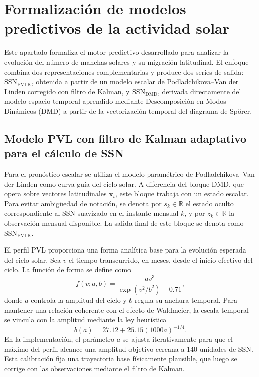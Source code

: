 \section{Formalización de modelos predictivos de la actividad solar}
\label{sec:forecast}

Este apartado formaliza el motor predictivo desarrollado para analizar la evolución del número de manchas solares y su migración latitudinal. El enfoque combina dos representaciones complementarias y produce dos series de salida: $\mathrm{SSN}_{\mathrm{PVLK}}$, obtenida a partir de un modelo escalar de Podladchikova--Van der Linden corregido con filtro de Kalman, y $\mathrm{SSN}_{\mathrm{DMD}}$, derivada directamente del modelo espacio-temporal aprendido mediante Descomposición en Modos Dinámicos (DMD) a partir de la vectorización temporal del diagrama de Spörer.

\subsection{Modelo PVL con filtro de Kalman adaptativo para el cálculo de SSN}

Para el pronóstico escalar se utiliza el modelo paramétrico de Podladchikova--Van der Linden como curva guía del ciclo solar. A diferencia del bloque DMD, que opera sobre vectores latitudinales $\mathbf{x}_t$, este bloque trabaja con un estado escalar. Para evitar ambigüedad de notación, se denota por $s_k\in\mathbb{R}$ el estado oculto correspondiente al SSN suavizado en el instante mensual $k$, y por $z_k\in\mathbb{R}$ la observación mensual disponible. La salida final de este bloque se denota como $\mathrm{SSN}_{\mathrm{PVLK}}$.

El perfil PVL proporciona una forma analítica base para la evolución esperada del ciclo solar. Sea $v$ el tiempo transcurrido, en meses, desde el inicio efectivo del ciclo. La función de forma se define como
\begin{equation}
f(v;a,b)=\frac{a v^{3}}{\exp\!\left(v^{2}/b^{2}\right)-0.71},
\end{equation}
donde $a$ controla la amplitud del ciclo y $b$ regula su anchura temporal. Para mantener una relación coherente con el efecto de Waldmeier, la escala temporal se vincula con la amplitud mediante la ley heurística
\begin{equation}
b(a)=27.12+25.15(1000a)^{-1/4}.
\end{equation}
En la implementación, el parámetro $a$ se ajusta iterativamente para que el máximo del perfil alcance una amplitud objetivo cercana a 140 unidades de SSN. Esta calibración fija una trayectoria base físicamente plausible, que luego se corrige con las observaciones mediante el filtro de Kalman.

